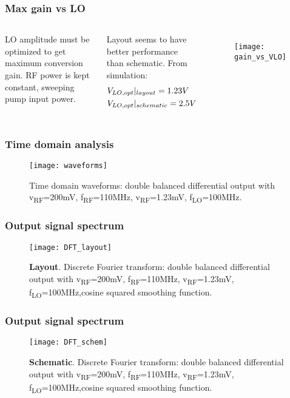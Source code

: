 \begin{frame}
\frametitle{Max gain vs LO}
\begin{columns}
	LO amplitude must be optimized to get maximum conversion gain. RF power is kept constant, sweeping pump input power.
	
	Layout seems to have better performance than schematic. From simulation:
	\begin{align}
	&V_{LO,opt}|_{layout}=1.23V \notag \\
	&V_{LO,opt}|_{schematic}=2.5V \notag
	\end{align}
	\begin{figure}[H]
		\centering
		\texttt{[image: gain\_vs\_VLO]}
		\label{fig:maxGainvsLO}
	\end{figure}
\end{columns}
\end{frame}

\begin{frame}
\frametitle{Time domain analysis}

	\begin{figure}[H]
		\centering
		\texttt{[image: waveforms]}
		\caption{Time domain waveforms: double balanced differential output with v\textsubscript{RF}=200mV,  f\textsubscript{RF}=110MHz, v\textsubscript{RF}=1.23mV, f\textsubscript{LO}=100MHz.}
		\label{fig:TdomaniWF}
	\end{figure}

\end{frame}

\begin{frame}
\frametitle{Output signal spectrum}
	\begin{figure}[H]
		\centering
		\texttt{[image: DFT\_layout]}
		\caption{\textbf{Layout}. Discrete Fourier transform: double balanced differential output with v\textsubscript{RF}=200mV,  f\textsubscript{RF}=110MHz, v\textsubscript{RF}=1.23mV, f\textsubscript{LO}=100MHz,cosine squared smoothing function.}
	\end{figure}
\end{frame}

\begin{frame}
\frametitle{Output signal spectrum}
	\begin{figure}[H]
	\centering
	\texttt{[image: DFT\_schem]}
	\caption{\textbf{Schematic}. Discrete Fourier transform: double balanced differential output with v\textsubscript{RF}=200mV,  f\textsubscript{RF}=110MHz, v\textsubscript{RF}=1.23mV, f\textsubscript{LO}=100MHz,cosine squared smoothing function.}
	\end{figure}
\end{frame}

